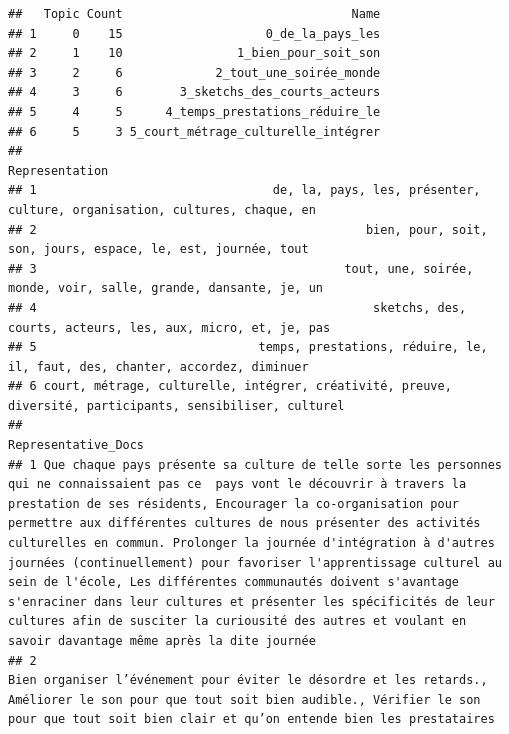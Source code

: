 \documentclass[
]{article}
\begin{document}
\begin{verbatim}
##   Topic Count                                Name
## 1     0    15                    0_de_la_pays_les
## 2     1    10                1_bien_pour_soit_son
## 3     2     6             2_tout_une_soirée_monde
## 4     3     6        3_sketchs_des_courts_acteurs
## 5     4     5      4_temps_prestations_réduire_le
## 6     5     3 5_court_métrage_culturelle_intégrer
##                                                                                              Representation
## 1                                 de, la, pays, les, présenter, culture, organisation, cultures, chaque, en
## 2                                              bien, pour, soit, son, jours, espace, le, est, journée, tout
## 3                                           tout, une, soirée, monde, voir, salle, grande, dansante, je, un
## 4                                               sketchs, des, courts, acteurs, les, aux, micro, et, je, pas
## 5                               temps, prestations, réduire, le, il, faut, des, chanter, accordez, diminuer
## 6 court, métrage, culturelle, intégrer, créativité, preuve, diversité, participants, sensibiliser, culturel
##                                                                                                                                                                                                                                                                                                                                                                                                                                                                                                                                                                                                                                                 Representative_Docs
## 1 Que chaque pays présente sa culture de telle sorte les personnes qui ne connaissaient pas ce  pays vont le découvrir à travers la prestation de ses résidents, Encourager la co-organisation pour permettre aux différentes cultures de nous présenter des activités culturelles en commun. Prolonger la journée d'intégration à d'autres journées (continuellement) pour favoriser l'apprentissage culturel au sein de l'école, Les différentes communautés doivent s'avantage s'enraciner dans leur cultures et présenter les spécificités de leur cultures afin de susciter la curiousité des autres et voulant en savoir davantage même après la dite journée
## 2                                                                                                                                                                                                                                                                                                                                                                                                                                                       Bien organiser l’événement pour éviter le désordre et les retards., Améliorer le son pour que tout soit bien audible., Vérifier le son pour que tout soit bien clair et qu’on entende bien les prestataires

\end{verbatim}
\end{document}
